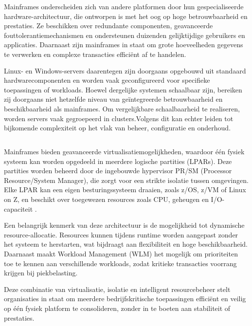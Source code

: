 Mainframes onderscheiden zich van andere platformen door hun gespecialiseerde hardware-architectuur, die ontworpen is met het oog op hoge betrouwbaarheid en prestaties. Ze beschikken over redundante componenten, geavanceerde fouttolerantiemechanismen en ondersteunen duizenden gelijktijdige gebruikers en applicaties. Daarnaast zijn mainframes in staat om grote hoeveelheden gegevens te verwerken en complexe transacties efficiënt af te handelen.

Linux- en Windows-servers daarentegen zijn doorgaans opgebouwd uit standaard hardwarecomponenten en worden vaak geconfigureerd voor specifieke toepassingen of workloads. Hoewel dergelijke systemen schaalbaar zijn, bereiken zij doorgaans niet hetzelfde niveau van geïntegreerde betrouwbaarheid en beschikbaarheid als mainframes. Om vergelijkbare schaalbaarheid te realiseren, worden servers vaak gegroepeerd in clusters.Volgens \textcite{EES2025} dit kan echter leiden tot bijkomende complexiteit op het vlak van beheer, configuratie en onderhoud.

\subsection{}
\label{sec:virtualisatie-en-resourcebeheer}
Mainframes bieden geavanceerde virtualisatiemogelijkheden, waardoor één fysiek systeem kan worden opgedeeld in meerdere logische partities (LPARs). Deze partities worden beheerd door de ingebouwde hypervisor PR/SM (Processor Resource/System Manager), die zorgt voor een strikte isolatie tussen omgevingen. Elke LPAR kan een eigen besturingssysteem draaien, zoals z/OS, z/VM of Linux on Z, en beschikt over toegewezen resources zoals CPU, geheugen en I/O-capaciteit \autocite{IBMIntroLPAR}.

Een belangrijk kenmerk van deze architectuur is de mogelijkheid tot dynamische resource-allocatie. Resources kunnen tijdens runtime worden aangepast zonder het systeem te herstarten, wat bijdraagt aan flexibiliteit en hoge beschikbaarheid. Daarnaast maakt Workload Management (WLM) het mogelijk om prioriteiten toe te kennen aan verschillende workloads, zodat kritieke transacties voorrang krijgen bij piekbelasting.\autocite{IBM_zOS_Concepts}

Deze combinatie van virtualisatie, isolatie en intelligent resourcebeheer stelt organisaties in staat om meerdere bedrijfskritische toepassingen efficiënt en veilig op één fysiek platform te consolideren, zonder in te boeten aan stabiliteit of prestaties.

